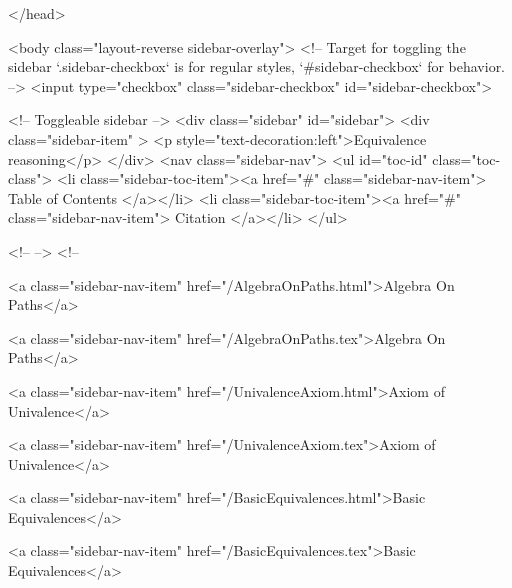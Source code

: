   
</head>




  <body class="layout-reverse sidebar-overlay">
    <!-- Target for toggling the sidebar `.sidebar-checkbox` is for regular
     styles, `#sidebar-checkbox` for behavior. -->
<input type="checkbox" class="sidebar-checkbox" id="sidebar-checkbox">

<!-- Toggleable sidebar -->
<div class="sidebar" id="sidebar">
  <div class="sidebar-item" >
    <p style="text-decoration:left">Equivalence reasoning</p>
  </div>
  <nav class="sidebar-nav">
    <ul id="toc-id" class="toc-class">
  <li class="sidebar-toc-item"><a href="#" class="sidebar-nav-item"> Table of Contents </a></li>
  <li class="sidebar-toc-item"><a href="#" class="sidebar-nav-item"> Citation </a></li>
</ul>


    <!--  -->
    <!-- 
      
    
      
    
      
    
      
    
      
        
      
    
      
        
          <a class="sidebar-nav-item" href="/AlgebraOnPaths.html">Algebra On Paths</a>
        
      
    
      
        
          <a class="sidebar-nav-item" href="/AlgebraOnPaths.tex">Algebra On Paths</a>
        
      
    
      
        
          <a class="sidebar-nav-item" href="/UnivalenceAxiom.html">Axiom of Univalence</a>
        
      
    
      
        
          <a class="sidebar-nav-item" href="/UnivalenceAxiom.tex">Axiom of Univalence</a>
        
      
    
      
        
          <a class="sidebar-nav-item" href="/BasicEquivalences.html">Basic Equivalences</a>
        
      
    
      
        
          <a class="sidebar-nav-item" href="/BasicEquivalences.tex">Basic Equivalences</a>
        
